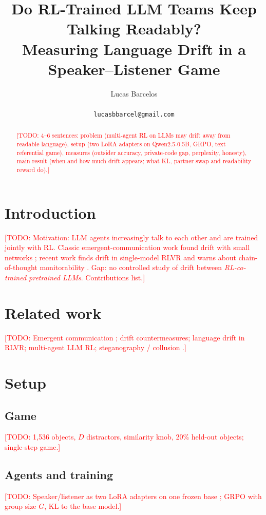 \documentclass{article}
\title{Do RL-Trained LLM Teams Keep Talking Readably?\\
Measuring Language Drift in a Speaker--Listener Game}
\author{Lucas Barcelos \\ \todo{university, department} \\ \texttt{lucasbbarcel@gmail.com}}
\newcommand{\todo}[1]{\textcolor{red}{[TODO: #1]}}
\begin{document}
\maketitle

\begin{abstract}
\todo{4--6 sentences: problem (multi-agent RL on LLMs may drift away from readable language),
setup (two LoRA adapters on Qwen2.5-0.5B, GRPO, text referential game),
measures (outsider accuracy, private-code gap, perplexity, honesty),
main result (when and how much drift appears; what KL, partner swap and readability reward do).}
\end{abstract}

\section{Introduction}
\todo{Motivation: LLM agents increasingly talk to each other and are trained jointly with RL.
Classic emergent-communication work found drift with small networks
\citep{lee2019countering,lazaridou2020multi}; recent work finds drift in single-model RLVR
\citep{sullivan2026drift} and warns about chain-of-thought monitorability \citep{korbak2025cot,baker2025monitoring}.
Gap: no controlled study of drift between \emph{RL-co-trained pretrained LLMs}. Contributions list.}

\section{Related work}
\todo{Emergent communication \citep{lazaridou2020emergent,lowe2019pitfalls}; drift countermeasures;
language drift in RLVR; multi-agent LLM RL; steganography / collusion \citep{motwani2024secret}.}

\section{Setup}
\subsection{Game}
\todo{1,536 objects, $D$ distractors, similarity knob, 20\% held-out objects; single-step game.}
\subsection{Agents and training}
\todo{Speaker/listener as two LoRA adapters on one frozen base \citep{hu2021lora,qwen2025};
GRPO \citep{shao2024deepseekmath} with group size $G$, KL to the base model.}
\end{document}
